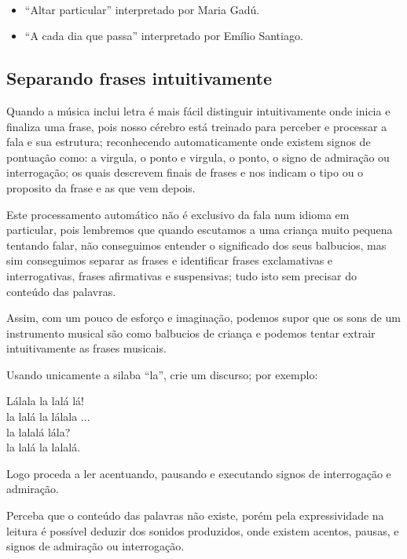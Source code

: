 \begin{example} ~
\begin{itemize}
\item ``Altar particular'' interpretado por Maria Gadú. 
\item ``A cada dia que passa'' interpretado por Emílio Santiago.
\end{itemize}
\end{example}



\subsection{Separando frases intuitivamente}
\label{subsec:fraseintuitivamente}
Quando a música inclui letra é mais fácil distinguir intuitivamente  
onde inicia e finaliza uma frase,
pois nosso cérebro está treinado para perceber e processar a fala e sua estrutura;
reconhecendo automaticamente onde existem signos de pontuação como:
a virgula, o ponto e virgula, o ponto, o signo de admiração ou interrogação;
os quais descrevem finais de frases e nos indicam o tipo ou o proposito da frase e as que vem depois.

Este processamento automático não é exclusivo da fala num idioma em particular,
pois lembremos que quando escutamos a uma criança muito pequena tentando falar,
não conseguimos entender o significado dos seus balbucios, 
mas sim conseguimos separar as frases e identificar frases exclamativas e interrogativas,
frases afirmativas e suspensivas;
tudo isto sem precisar do conteúdo das palavras.

Assim, com um pouco de esforço e imaginação,
podemos supor que os sons de um instrumento musical 
são como balbucios de criança e podemos tentar extrair intuitivamente as frases musicais. 


\begin{example}[O discurso de ``la'']
\label{ex:discrusodela}
Usando unicamente a silaba ``la'', crie um discurso; por exemplo:
\begin{citando}%
Lálala la lalá lá!\\
la lalá la lálala ...\\
la lalalá lála?\\
la lalá la lalalá.\\
\end{citando}%
Logo proceda a ler acentuando, pausando e
executando signos de interrogação e admiração.

Perceba que o conteúdo das palavras não existe, 
porém pela expressividade na leitura é possível deduzir dos sonidos produzidos,
onde existem acentos, pausas, e signos de admiração ou interrogação.
\end{example}

